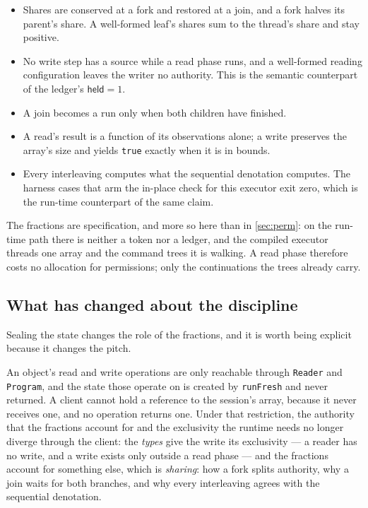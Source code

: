 \documentclass[11pt,a4paper]{article}
\theoremstyle{definition}
\theoremstyle{plain}
\newcommand{\held}{\mathsf{held}}
\newcommand{\code}[1]{\texttt{#1}}
\begin{document}
\begin{itemize}[leftmargin=1.4em,itemsep=2pt]
\item Shares are conserved at a fork and restored at a join, and a fork halves
its parent's share. A well-formed leaf's shares sum to the thread's share and
stay positive.
\item No write step has a source while a read phase runs, and a well-formed
reading configuration leaves the writer no authority. This is the semantic
counterpart of the ledger's $\held = 1$.
\item A join becomes a run only when both children have finished.
\item A read's result is a function of its observations alone; a write preserves
the array's size and yields \code{true} exactly when it is in bounds.
\item Every interleaving computes what the sequential denotation computes. The
harness cases that arm the in-place check for this executor exit zero, which is
the run-time counterpart of the same claim.
\end{itemize}

The fractions are specification, and more so here than in \cref{sec:perm}: on
the run-time path there is neither a token nor a ledger, and the compiled
executor threads one array and the command trees it is walking. A read phase
therefore costs no allocation for permissions; only the continuations the trees
already carry.

\subsection{What has changed about the discipline}

Sealing the state changes the role of the fractions, and it is worth being
explicit because it changes the pitch.

An object's read and write operations are only reachable through \code{Reader}
and \code{Program}, and the state those operate on is created by \code{runFresh}
and never returned. A client cannot hold a reference to the session's array,
because it never receives one, and no operation returns one. Under that
restriction, the authority that the fractions account for and the exclusivity
the runtime needs no longer diverge through the client: the \emph{types} give
the write its exclusivity --- a reader has no write, and a write exists only
outside a read phase --- and the fractions account for something else, which is
\emph{sharing}: how a fork splits authority, why a join waits for both branches,
and why every interleaving agrees with the sequential denotation.
\end{document}
